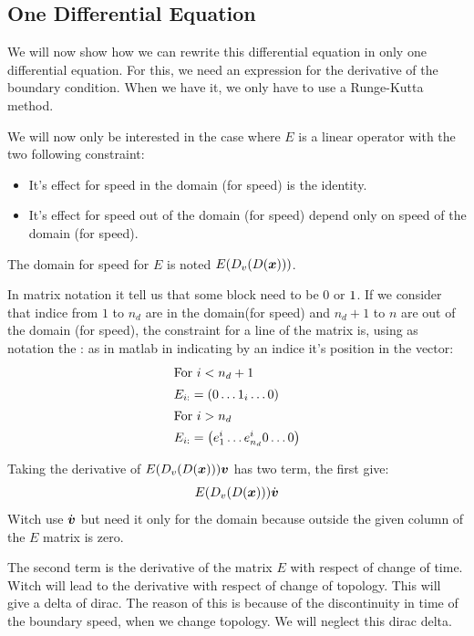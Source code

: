 \subsection{One Differential Equation}
\label{differentialequation}
We will now show how we can rewrite this differential equation in only one differential equation.
For this, we need an expression for the derivative of the boundary condition.
When we have it, we only have to use a Runge-Kutta method.


We will now only be interested in the case where $E$ is a linear operator with the two following constraint:
\begin{itemize}
	\item It's effect for speed in the domain (for speed) is the identity.
	\item It's effect for speed out of the domain (for speed) depend only on speed of the domain (for speed).
\end{itemize}
The domain for speed for $E$ is noted $E(D_v(D({\boldsymbol {x}})))$.

In matrix notation it tell us that some block need to be $0$ or $1$.
If we consider that indice from $1$ to $n_d$ are in the domain(for speed) and $n_d+1$ to $n$ are out of the domain (for speed), the constraint for a line of the matrix is,
using as notation the : as in matlab in indicating by an indice it's position in the vector:
\begin{align}
	\intertext{For $i<n_d+1$}
	E_{i :}&=\left( 0 \ldots 1_{i} \ldots 0\right)\\
	\intertext{For $i>n_d$}
	E_{i :}&=\left( e^i_{1}\ldots e^i_{n_d} 0\ldots 0\right)\\
\end{align}

Taking the derivative of $E(D_v(D({\boldsymbol {x}}))){\boldsymbol {v}}$ has two term, the first give:
\begin{equation}
	E(D_v(D({\boldsymbol {x}})))\dot{{\boldsymbol {v}}}
\end{equation}
Witch use $\dot{{\boldsymbol {v}}}$ but need it only for the domain because outside the given column of the $E$ matrix is zero.

The second term is the derivative of the matrix $E$ with respect of change of time. Witch will lead to the derivative with respect of change of topology.
This will give a delta of dirac.
The reason of this is because of the discontinuity in time of the boundary speed, when we change topology.
We will neglect this dirac delta. 

